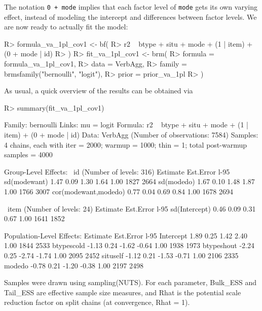 \documentclass[
]{jss}
\begin{document}
The notation \texttt{0\ +\ mode} implies that each factor level of
\texttt{mode} gets its own varying effect, instead of modeling the
intercept and differences between factor levels. We are now ready to
actually fit the model:

\begin{CodeChunk}

\begin{CodeInput}
R> formula_va_1pl_cov1 <- bf(
R>   r2 ~ btype + situ + mode + (1 | item) + (0 + mode | id)
R> )
R> fit_va_1pl_cov1 <- brm(
R>   formula = formula_va_1pl_cov1,
R>   data = VerbAgg, 
R>   family = brmsfamily("bernoulli", "logit"),
R>   prior = prior_va_1pl
R> )
\end{CodeInput}
\end{CodeChunk}

As usual, a quick overview of the results can be obtained via

\begin{CodeChunk}

\begin{CodeInput}
R> summary(fit_va_1pl_cov1)
\end{CodeInput}

\begin{CodeOutput}
 Family: bernoulli 
  Links: mu = logit 
Formula: r2 ~ btype + situ + mode + (1 | item) + (0 + mode | id) 
   Data: VerbAgg (Number of observations: 7584) 
Samples: 4 chains, each with iter = 2000; warmup = 1000; thin = 1;
         total post-warmup samples = 4000

Group-Level Effects: 
~id (Number of levels: 316) 
                     Estimate Est.Error l-95%
sd(modewant)             1.47      0.09     1.30     1.64 1.00     1827     2664
sd(modedo)               1.67      0.10     1.48     1.87 1.00     1766     3007
cor(modewant,modedo)     0.77      0.04     0.69     0.84 1.00     1678     2694

~item (Number of levels: 24) 
              Estimate Est.Error l-95%
sd(Intercept)     0.46      0.09     0.31     0.67 1.00     1641     1852

Population-Level Effects: 
           Estimate Est.Error l-95%
Intercept      1.89      0.25     1.42     2.40 1.00     1844     2533
btypescold    -1.13      0.24    -1.62    -0.64 1.00     1938     1973
btypeshout    -2.24      0.25    -2.74    -1.74 1.00     2095     2452
situself      -1.12      0.21    -1.53    -0.71 1.00     2106     2335
modedo        -0.78      0.21    -1.20    -0.38 1.00     2197     2498

Samples were drawn using sampling(NUTS). For each parameter, Bulk_ESS
and Tail_ESS are effective sample size measures, and Rhat is the potential
scale reduction factor on split chains (at convergence, Rhat = 1).
\end{CodeOutput}
\end{CodeChunk}
\end{document}
